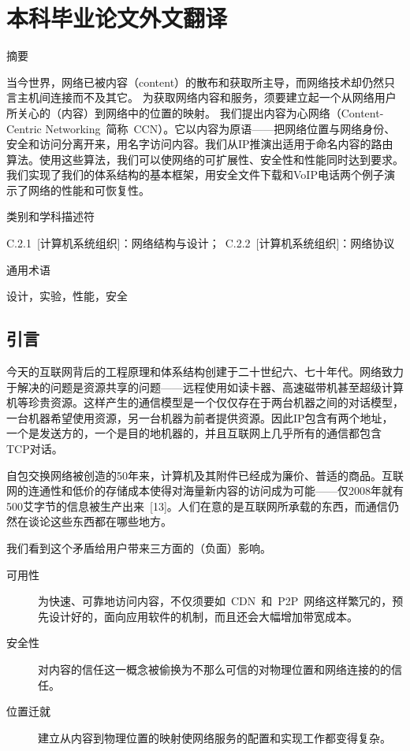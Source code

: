 \chapter{本科毕业论文外文翻译}


\heiti
摘要

\songti
当今世界，网络已被内容（content）的散布和获取所主导，而网络技术却仍然只言主机间连接而不及其它。%
为获取网络内容和服务，须要建立起一个从网络用户所关心的（内容）到网络中的位置的映射。%
我们提出内容为心网络（Content-Centric Networking~简称~CCN）。它以内容为原语——把网络位置与网络身份、安全和访问分离开来，用名字访问内容。我们从IP推演出适用于命名内容的路由算法。使用这些算法，我们可以使网络的可扩展性、安全性和性能同时达到要求。我们实现了我们的体系结构的基本框架，用安全文件下载和VoIP电话两个例子演示了网络的性能和可恢复性。

\heiti
类别和学科描述符

\songti
C.2.1~[计算机系统组织]：网络结构与设计；~C.2.2~[计算机系统组织]：网络协议

\heiti
通用术语

\songti
设计，实验，性能，安全



\section{引言}
今天的互联网背后的工程原理和体系结构创建于二十世纪六、七十年代。网络致力于解决的问题是资源共享的问题——远程使用如读卡器、高速磁带机甚至超级计算机等珍贵资源。这样产生的通信模型是一个仅仅存在于两台机器之间的对话模型，一台机器希望使用资源，另一台机器为前者提供资源。因此IP包含有两个地址，一个是发送方的，一个是目的地机器的，并且互联网上几乎所有的通信都包含TCP对话。

自包交换网络被创造的50年来，计算机及其附件已经成为廉价、普适的商品。互联网的连通性和低价的存储成本使得对海量新内容的访问成为可能——仅2008年就有500艾字节的信息被生产出来~[13]。人们在意的是互联网所承载的东西，而通信仍然在谈论这些东西都在哪些地方。

我们看到这个矛盾给用户带来三方面的（负面）影响。

\begin{description}
\item[可用性]为快速、可靠地访问内容，不仅须要如~CDN~和~P2P~网络这样繁冗的，预先设计好的，面向应用软件的机制，而且还会大幅增加带宽成本。
\item[安全性]对内容的信任这一概念被偷换为不那么可信的对物理位置和网络连接的的信任。
\item[位置迁就]建立从内容到物理位置的映射使网络服务的配置和实现工作都变得复杂。
\end{description}

